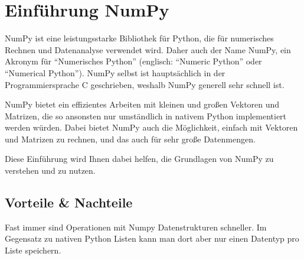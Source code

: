 \documentclass[
  letterpaper,
  DIV=11,
  numbers=noendperiod]{scrreprt}
\begin{document}
\chapter{Einführung NumPy}\label{einfuxfchrung-numpy}

NumPy ist eine leistungsstarke Bibliothek für Python, die für
numerisches Rechnen und Datenanalyse verwendet wird. Daher auch der Name
NumPy, ein Akronym für ``Numerisches Python'' (englisch: ``Numeric
Python'' oder ``Numerical Python''). NumPy selbst ist hauptsächlich in
der Programmiersprache C geschrieben, weshalb NumPy generell sehr
schnell ist.

NumPy bietet ein effizientes Arbeiten mit kleinen und großen Vektoren
und Matrizen, die so ansonsten nur umständlich in nativem Python
implementiert werden würden. Dabei bietet NumPy auch die Möglichkeit,
einfach mit Vektoren und Matrizen zu rechnen, und das auch für sehr
große Datenmengen.

Diese Einführung wird Ihnen dabei helfen, die Grundlagen von NumPy zu
verstehen und zu nutzen.

\section{Vorteile \& Nachteile}\label{vorteile-nachteile}

Fast immer sind Operationen mit Numpy Datenstrukturen schneller. Im
Gegensatz zu nativen Python Listen kann man dort aber nur einen Datentyp
pro Liste speichern.
\end{document}
